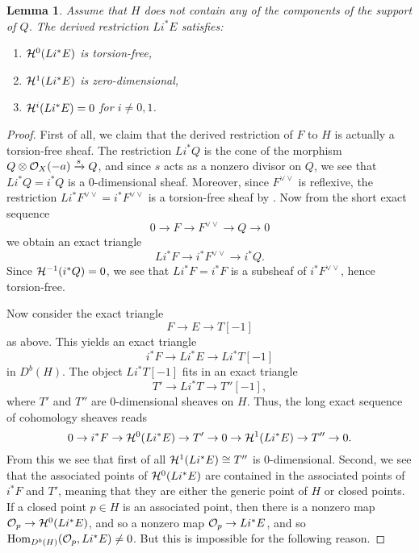 \documentclass[letterpaper,10pt]{article}
\newtheorem{lem}[thm]{Lemma}
\theoremstyle{remark}
\begin{document}
\begin{lem}
Assume that $H$ does not contain any of the components of the support of $Q$. The derived restriction $L i^* E$ satisfies:
\begin{enumerate}[(i')]
    \item $\mathcal{H}^0(L i^* E)$ is torsion-free,
    \item $\mathcal{H}^1(L i^* E)$ is zero-dimensional,
    \item $\mathcal{H}^i(L i^* E) = 0$ for $i \neq 0, 1$. 
\end{enumerate}
\end{lem}
\begin{proof}
First of all, we claim that the derived restriction of $F$ to $H$ is actually a torsion-free sheaf. The restriction $Li^* Q$ is the cone of the morphism $Q \otimes \mathcal{O}_X(-a) \xrightarrow{s} Q$, and since $s$ acts as a nonzero divisor on $Q$, we see that $L i^* Q = i^* Q$ is a 0-dimensional sheaf. Moreover, since $F^{\vee\vee}$ is reflexive, the restriction $L i^* F^{\vee\vee} = i^* F^{\vee\vee}$ is a torsion-free sheaf by \cite[Corollary 1.1.14]{HL}. Now from the short exact sequence
\[ 0 \to F \to F^{\vee\vee} \to Q \to 0 \]
we obtain an exact triangle
\[ L i^* F \to i^* F^{\vee\vee} \to i^*Q. \]
Since $\mathcal{H}^{-1}(i^* Q) = 0$, we see that $L i^* F = i^* F$ is a subsheaf of $i^* F^{\vee\vee}$, hence torsion-free.

Now consider the exact triangle
\[ F \to E \to T[-1] \]
as above. This yields an exact triangle
\[ i^*F \to L i^* E \to L i^* T[-1] \]
in $D^b(H)$. The object $L i^* T[-1]$ fits in an exact triangle
\[ T' \to L i^* T \to T''[-1], \]
where $T'$ and $T''$ are 0-dimensional sheaves on $H$. Thus, the long exact sequence of cohomology sheaves reads
\[ 0 \to i^* F \to \mathcal{H}^0(L i^* E) \to T' \to 0 \to \mathcal{H}^1(Li^* E) \to T'' \to 0. \]
From this we see that first of all $\mathcal{H}^1(Li^* E) \cong T''$ is 0-dimensional. Second, we see that the associated points of $\mathcal{H}^0(L i^* E)$ are contained in the associated points of $i^* F$ and $T'$, meaning that they are either the generic point of $H$ or closed points. If a closed point $p \in H$ is an associated point, then there is a nonzero map $\mathcal{O}_p \to \mathcal{H}^0(L i^* E)$, and so a nonzero map $\mathcal{O}_p \to L i^* E$, and so $\mathrm{Hom}_{D^b(H)}(\mathcal{O}_p, L i^* E) \neq 0$. But this is impossible for the following reason.


\end{proof}
\end{document}
